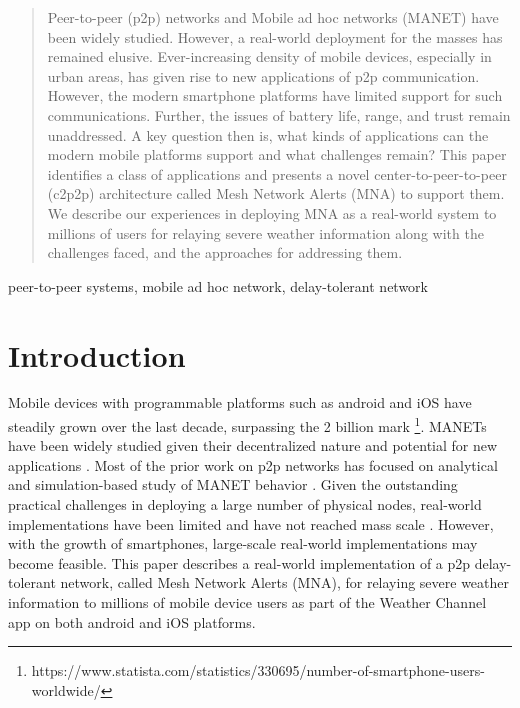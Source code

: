 \documentclass[conference]{IEEEtran}
\begin{document}
\begin{abstract}
Peer-to-peer (p2p) networks and Mobile ad hoc networks (MANET) have
been widely studied. However, a real-world deployment for the masses
has remained elusive. Ever-increasing density of mobile devices,
especially in urban areas, has given rise to new applications of p2p
communication. However, the modern smartphone platforms have limited
support for such communications. Further, the issues of battery life,
range, and trust remain unaddressed. A key question then is, what
kinds of applications can the modern mobile platforms support and what
challenges remain? This paper identifies a class of applications and
presents a novel center-to-peer-to-peer (c2p2p) architecture called
Mesh Network Alerts (MNA) to support them.  We describe our
experiences in deploying MNA as a real-world system to millions of
users for relaying severe weather information along with the
challenges faced, and the approaches for addressing them.
\end{abstract}

\begin{IEEEkeywords}
peer-to-peer systems, mobile ad hoc network, delay-tolerant network
\end{IEEEkeywords}

\section{Introduction}
Mobile devices with programmable platforms such as android and iOS
have steadily grown over the last decade, surpassing the 2 billion
mark \footnote{https://www.statista.com/statistics/330695/number-of-smartphone-users-worldwide/}. MANETs
have been widely studied given their decentralized nature and
potential for new applications
\cite{loo-manet-2011,perkins-ad-hoc-2001}. Most of the prior work on
p2p networks has focused on analytical and simulation-based study of
MANET behavior
\cite{zhang-topology-manet-2015,marti-misbehavior-manet-2000,mauve-pos-routing-manet-2001}. Given
the outstanding practical challenges in deploying a large number of
physical nodes, real-world implementations have been limited and have
not reached mass scale \cite{kiess-manet-impl-2007}. However, with the
growth of smartphones, large-scale real-world implementations may
become feasible. This paper describes a real-world implementation of a
p2p delay-tolerant network, called Mesh Network Alerts (MNA), for
relaying severe weather information to millions of mobile device users
as part of the Weather Channel app \cite{mna} on both android and iOS
platforms.
\end{document}
